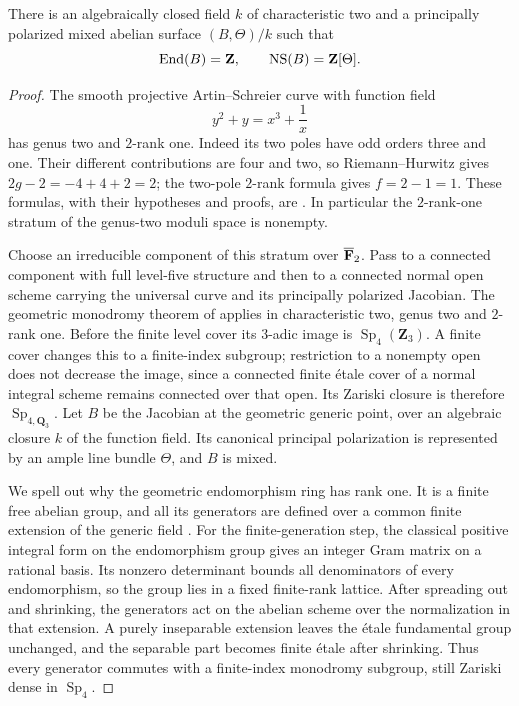 \begin{lemma}\label{lem:mixed-principal-rank-one}
There is an algebraically closed field $k$ of characteristic two and a principally polarized mixed abelian surface $(B,\Theta)/k$ such that
\[
             \operatorname{End}(B)=\mathbf Z,\qquad \operatorname{NS}(B)=\mathbf Z[\Theta].
\]
\end{lemma}
\begin{proof}
The smooth projective Artin--Schreier curve with function field
\[
                         y^2+y=x^3+\frac1x
\]
has genus two and $2$-rank one. Indeed its two poles have odd orders three and one. Their different contributions are four and two, so Riemann--Hurwitz gives $2g-2=-4+4+2=2$; the two-pole $2$-rank formula gives $f=2-1=1$. These formulas, with their hypotheses and proofs, are \citet[Lemmas~2.6--2.7 and Example~2.8, pp.~711--712]{PriesZhu}. In particular the $2$-rank-one stratum of the genus-two moduli space is nonempty.

Choose an irreducible component of this stratum over $\overline{\mathbf F}_2$. Pass to a connected component with full level-five structure and then to a connected normal open scheme carrying the universal curve and its principally polarized Jacobian. The geometric monodromy theorem of \citet[Theorem~4.5, pp.~14--15 of the author version; scheme rigidifications in \S5.1, pp.~17--18]{AchterPries} applies in characteristic two, genus two and $2$-rank one. Before the finite level cover its $3$-adic image is $\operatorname{Sp}_4(\mathbf Z_3)$. A finite cover changes this to a finite-index subgroup; restriction to a nonempty open does not decrease the image, since a connected finite \'etale cover of a normal integral scheme remains connected over that open. Its Zariski closure is therefore $\operatorname{Sp}_{4,\mathbf Q_3}$. Let $B$ be the Jacobian at the geometric generic point, over an algebraic closure $k$ of the function field. Its canonical principal polarization is represented by an ample line bundle $\Theta$, and $B$ is mixed.

We spell out why the geometric endomorphism ring has rank one. It is a finite free abelian group, and all its generators are defined over a common finite extension of the generic field \citep[Theorem~12.10 and Corollaries~12.11--12.13, pp.~182--184]{EGM}. For the finite-generation step, the classical positive integral form on the endomorphism group gives an integer Gram matrix on a rational basis. Its nonzero determinant bounds all denominators of every endomorphism, so the group lies in a fixed finite-rank lattice. After spreading out and shrinking, the generators act on the abelian scheme over the normalization in that extension. A purely inseparable extension leaves the \'etale fundamental group unchanged, and the separable part becomes finite \'etale after shrinking. Thus every generator commutes with a finite-index monodromy subgroup, still Zariski dense in $\operatorname{Sp}_4$.


\end{proof}
